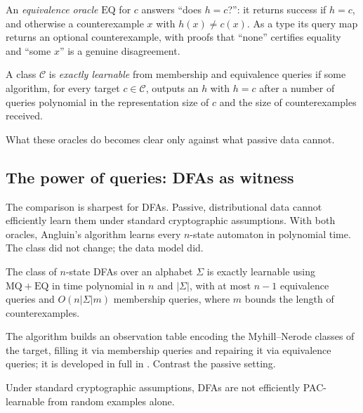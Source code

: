 \begin{defn}
\label{def:eq}
An \emph{equivalence oracle} $\mathrm{EQ}$ for $c$ answers ``does $h = c$?'': it returns success if $h = c$, and otherwise a counterexample $x$ with $h(x) \neq c(x)$. As a type its query map returns an optional counterexample, with proofs that ``none'' certifies equality and ``some $x$'' is a genuine disagreement.
\end{defn}

\begin{defn}
\label{def:exact-learning}
A class $\mathcal{C}$ is \emph{exactly learnable} from membership and equivalence queries if some algorithm, for every target $c \in \mathcal{C}$, outputs an $h$ with $h = c$ after a number of queries polynomial in the representation size of $c$ and the size of counterexamples received.
\end{defn}

What these oracles do becomes clear only against what passive data cannot.

\subsection{The power of queries: DFAs as witness}

The comparison is sharpest for DFAs. Passive, distributional data cannot efficiently learn them under standard cryptographic assumptions. With both oracles, Angluin's algorithm learns every $n$-state automaton in polynomial time. The class did not change; the data model did.

\begin{thm}
\label{thm:lstar}
The class of $n$-state DFAs over an alphabet $\Sigma$ is exactly learnable using $\mathrm{MQ} + \mathrm{EQ}$ in time polynomial in $n$ and $|\Sigma|$, with at most $n - 1$ equivalence queries and $O(n|\Sigma| m)$ membership queries, where $m$ bounds the length of counterexamples.
\end{thm}

The algorithm builds an observation table encoding the Myhill--Nerode classes of the target, filling it via membership queries and repairing it via equivalence queries; it is developed in full in . Contrast the passive setting.

\begin{prop}
\label{prop:dfa-pac-hard}
Under standard cryptographic assumptions, DFAs are not efficiently PAC-learnable from random examples alone.
\end{prop}

